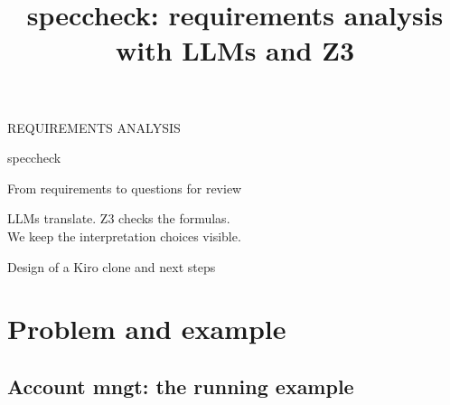 \documentclass[aspectratio=169,11pt]{beamer}
\title{speccheck: requirements analysis with LLMs and Z3}
\begin{document}


\begin{frame}[plain,label=main01]
\vspace{5mm}
{\color{Teal}\large REQUIREMENTS ANALYSIS\par}
\vspace{4mm}
{speccheck\par}
\vspace{2mm}
{From requirements to questions for review\par}
\vspace{8mm}
{\large LLMs translate. Z3 checks the formulas.\\We keep the interpretation choices visible.\par}
\vfill
{\color{Muted}\normalsize Design of a Kiro clone and next steps\par}
\end{frame}

\section{Problem and example}

\subsection{Account mngt: the running example}

\end{document}
